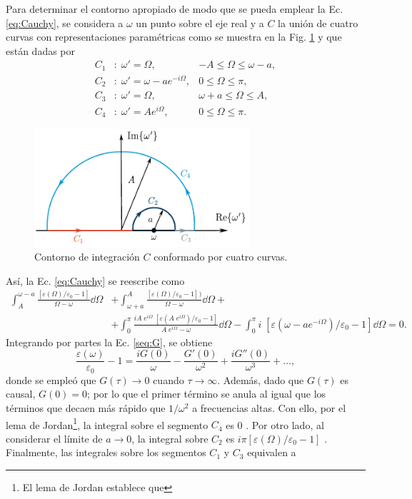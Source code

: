 %
Para determinar el contorno apropiado de modo que se pueda emplear la Ec. \eqref{eq:Cauchy}, se considera a $\omega$ un punto sobre el eje real y a $C$ la unión de cuatro curvas con representaciones paramétricas como se muestra en la Fig. \ref{integration_contour} y que están dadas por \cite{bohrenAbsorptionScatteringLight2008}
%
\begin{align*}
	C_1&: \; \omega'=\Omega, & -A\leq \Omega \leq \omega-a,\\
	C_2&: \; \omega'=\omega-ae^{-i\Omega}, & 0\leq\Omega\leq\pi,\\
	C_3&: \;\omega'=\Omega, & \omega+a\leq\Omega\leq A,\\
	C_4&: \;\omega'=Ae^{i\Omega}, & 0\leq\Omega\leq \pi.
\end{align*}
%
\begin{figure}[h]
	\centering
	\includegraphics[width=8cm]{../../Figuras/integration.pdf}
	\caption{Contorno de integración $C$ conformado por cuatro curvas.}
	\label{integration_contour}
\end{figure}
%
Así, la Ec. \eqref{eq:Cauchy} se reescribe como
\begin{align*}
	\int_A^{\omega-a}\frac{[\varepsilon(\Omega)/\varepsilon_0-1]}{\Omega-\omega}\dd{\Omega}&+	\int_{\omega+a}^{A}\frac{[\varepsilon(\Omega)/\varepsilon_0-1])}{\Omega-\omega}\dd{\Omega}+\\
	&+	\int_0^{\pi}\frac{iA\;e^{i\Omega}\; [\varepsilon(A\;e^{i\Omega})/\varepsilon_0-1]}{A\;e^{i\Omega}-\omega}\dd{\Omega}-\int_0^{\pi}i\;[\varepsilon(\omega-ae^{-i\Omega})/\varepsilon_0-1]\dd{\Omega}=0.
\end{align*}
Integrando por partes la Ec. \eqref{seq:G}, se obtiene  
%
\begin{equation*}
	\frac{\varepsilon(\omega)}{\varepsilon_0}-1=\frac{i G(0)}{\omega}-\frac{ G'(0)}{\omega^2}+\frac{i G''(0)}{\omega^3}+...,
\end{equation*}
%
donde se empleó que $G(\tau)\rightarrow 0$ cuando $\tau\rightarrow \infty$. Además, dado que $G(\tau)$ es causal, $G(0)=0$; por lo que el primer término se anula al igual que los términos que decaen más rápido que $1/\omega^2$ a frecuencias altas. Con ello, por el lema de Jordan\footnote{El lema de Jordan establece que }, la integral sobre el segmento $C_4$ es 0 \cite{bohrenAbsorptionScatteringLight2008}. Por otro lado, al considerar el límite de $a\to 0$, la integral sobre $C_2$ es $i\pi[\varepsilon(\Omega)/\varepsilon_0-1]$ \cite{jacksonClassicalElectrodynamics2021a}. Finalmente, las integrales sobre los segmentos $C_1$ y $C_3$ equivalen a 
